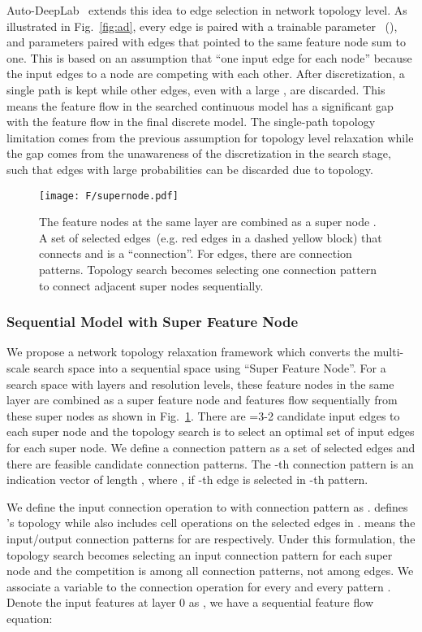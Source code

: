 \documentclass[final]{cvpr}
\begin{document}
Auto-DeepLab~\cite{liu2019auto} extends this idea to edge selection in network topology level. As illustrated in Fig.~\ref{fig:ad}, every edge is paired with a trainable parameter ~(), and parameters paired with edges that pointed to the same feature node sum to one. This is based on an assumption that ``one input edge for each node'' because the input edges to a node are competing with each other. After discretization, a single path is kept while other edges, even with a large , are discarded. This means the feature flow in the searched continuous model has a significant gap with the feature flow in the final discrete model. The single-path topology limitation comes from the previous assumption for topology level relaxation while the gap comes from the unawareness of the discretization in the search stage, such that edges with large probabilities can be discarded due to topology. 
\begin{figure}[]
\begin{center}
\texttt{[image: F/supernode.pdf]}
\end{center}
 \caption{The feature nodes at the same layer  are combined as a super node . A set of selected edges~(e.g. red edges in a dashed yellow block) that connects  and  is a ``connection''. For  edges, there are  connection patterns. Topology search becomes selecting one connection pattern to connect adjacent super nodes sequentially.}
\label{fig:sn}
\end{figure}

\subsubsection{Sequential Model with Super Feature Node}
We propose a network topology relaxation framework which converts the multi-scale search space into a sequential space using ``Super Feature Node''.
For a search space with  layers and  resolution levels, these  feature nodes in the same layer  are combined as a super feature node  and features flow sequentially from these  super nodes as shown in Fig.~\ref{fig:sn}. There are =3-2 candidate input edges to each super node and the topology search is to select an optimal set of input edges for each super node. We define a connection pattern as a set of selected edges and there are  feasible candidate connection patterns. The -th connection pattern  is an indication vector of length , where , if -th edge is selected in -th pattern.


We define the input connection operation to  with connection pattern  as .  defines 's topology while  also includes cell operations on the selected edges in .  means the input/output connection patterns for  are  respectively. Under this formulation, the topology search becomes selecting an input connection pattern for each super node and the competition is among all  connection patterns, not among edges. We associate a variable  to the connection operation  for every  and every pattern . Denote the input features at layer 0 as , we have a sequential feature flow equation:
\end{document}
